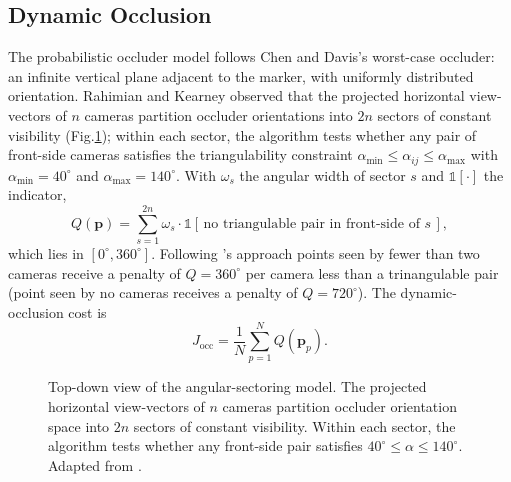 \documentclass[conference]{IEEEtran}
\begin{document}
\subsection{Dynamic Occlusion} \label{DO}
The probabilistic occluder model follows Chen and Davis's \cite{chen_camera_2000} worst-case occluder: an infinite vertical plane adjacent to the marker, with uniformly distributed orientation. Rahimian and Kearney \cite{rahimian_optimal_2017} observed that the projected horizontal view-vectors of $n$ cameras partition occluder orientations into $2n$ sectors of constant visibility (Fig.\ref{fig:occluder}); within each sector, the algorithm tests whether any pair of front-side cameras satisfies the triangulability constraint $\alpha_\text{min}\!\leq\!\alpha_{ij}\!\leq\!\alpha_\text{max}$ with $\alpha_\text{min}=40^\circ$ and $\alpha_\text{max}=140^\circ$. With $\omega_s$ the angular width of sector $s$ and $\mathbb{1}[\cdot]$ the indicator,
\begin{equation}
\label{eq:occlusion-point}
Q(\mathbf{p}) = \sum_{s=1}^{2n} \omega_s \cdot \mathbb{1}\!\left[\,\text{no triangulable pair in front-side of } s\,\right],
\end{equation}
which lies in $[0^\circ, 360^\circ]$. Following \cite{rahimian_optimal_2017}'s approach points seen by fewer than two cameras receive a penalty of $Q=360^\circ$ per camera less than a trinangulable pair (point seen by no cameras receives a penalty of $Q=720^\circ$). The dynamic-occlusion cost is
\begin{equation}
\label{eq:occ-cost}
J_\text{occ} = \frac{1}{N}\sum_{p=1}^{N} Q(\mathbf{p}_p).
\end{equation}

\begin{figure}[t]
\centering
{}
\caption{Top-down view of the angular-sectoring model. The projected horizontal view-vectors of $n$ cameras partition occluder orientation space into $2n$ sectors of constant visibility. Within each sector, the algorithm tests whether any front-side pair satisfies $40^\circ\!\leq\!\alpha\!\leq\!140^\circ$. Adapted from \cite{rahimian_optimal_2017}.}
\label{fig:occluder}
\end{figure}
\end{document}
